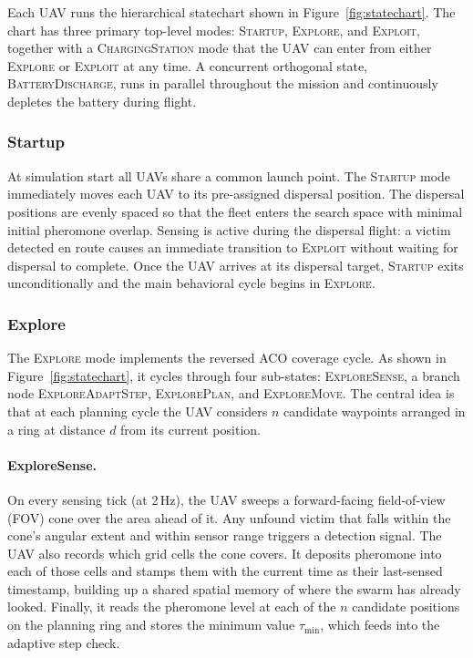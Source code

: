 \documentclass[10pt,a4paper,twocolumn]{article}
\begin{document}
Each UAV runs the hierarchical statechart shown in Figure~\ref{fig:statechart}. The chart has three primary top-level modes: \textsc{Startup}, \textsc{Explore}, and \textsc{Exploit}, together with a \textsc{ChargingStation} mode that the UAV can enter from either \textsc{Explore} or \textsc{Exploit} at any time. A concurrent orthogonal state, \textsc{BatteryDischarge}, runs in parallel throughout the mission and continuously depletes the battery during flight.

\subsubsection{Startup}

At simulation start all UAVs share a common launch point. The \textsc{Startup} mode immediately moves each UAV to its pre-assigned dispersal position. The dispersal positions are evenly spaced so that the fleet enters the search space with minimal initial pheromone overlap. Sensing is active during the dispersal flight: a victim detected en route causes an immediate transition to \textsc{Exploit} without waiting for dispersal to complete. Once the UAV arrives at its dispersal target, \textsc{Startup} exits unconditionally and the main behavioral cycle begins in \textsc{Explore}.

\subsubsection{Explore}

The \textsc{Explore} mode implements the reversed ACO coverage cycle. As shown in Figure~\ref{fig:statechart}, it cycles through four sub-states: \textsc{ExploreSense}, a branch node \textsc{ExploreAdaptStep}, \textsc{ExplorePlan}, and \textsc{ExploreMove}. The central idea is that at each planning cycle the UAV considers $n$ candidate waypoints arranged in a ring at distance $d$ from its current position.

\paragraph{ExploreSense.}
On every sensing tick (at 2\,Hz), the UAV sweeps a forward-facing field-of-view (FOV) cone over the area ahead of it. Any unfound victim that falls within the cone's angular extent and within sensor range triggers a detection signal. The UAV also records which grid cells the cone covers. It deposits pheromone into each of those cells and stamps them with the current time as their last-sensed timestamp, building up a shared spatial memory of where the swarm has already looked. Finally, it reads the pheromone level at each of the $n$ candidate positions on the planning ring and stores the minimum value $\tau_{\min}$, which feeds into the adaptive step check.
\end{document}

